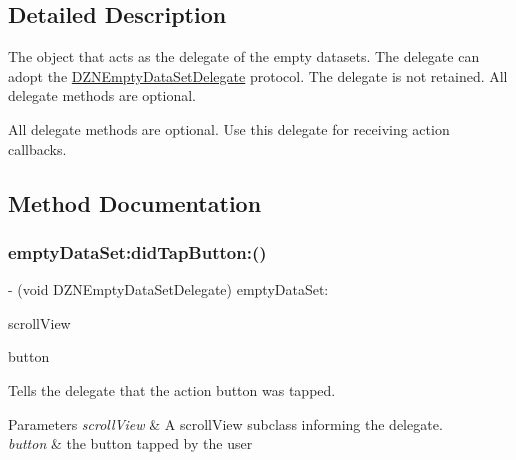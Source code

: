 \subsection{Detailed Description}
The object that acts as the delegate of the empty datasets.  The delegate can adopt the \mbox{\hyperlink{class_d_z_n_empty_data_set_delegate-p}{D\+Z\+N\+Empty\+Data\+Set\+Delegate}} protocol. The delegate is not retained. All delegate methods are optional.

All delegate methods are optional. Use this delegate for receiving action callbacks. 

\subsection{Method Documentation}
\mbox{\label{protocol_d_z_n_empty_data_set_delegate_01-p_a3de0fb46917c4b7f2c8997a4d7f187ab}} 
\subsubsection{\texorpdfstring{empty\+Data\+Set\+:did\+Tap\+Button\+:()}{emptyDataSet:didTapButton:()}}
{\footnotesize\ttfamily -\/ (void D\+Z\+N\+Empty\+Data\+Set\+Delegate) empty\+Data\+Set\+: \begin{DoxyParamCaption}\item[{(U\+I\+Scroll\+View $\ast$)}]{scroll\+View }\item[{didTapButton:(U\+I\+Button $\ast$)}]{button }\end{DoxyParamCaption}\hspace{0.3cm}{\ttfamily [optional]}}

Tells the delegate that the action button was tapped.


\begin{DoxyParams}{Parameters}
{\em scroll\+View} & A scroll\+View subclass informing the delegate. \\
\hline
{\em button} & the button tapped by the user \\
\hline
\end{DoxyParams}
\mbox{\label{protocol_d_z_n_empty_data_set_delegate_01-p_ac747454816e6c3fb89e83b8489b6d560}} 
